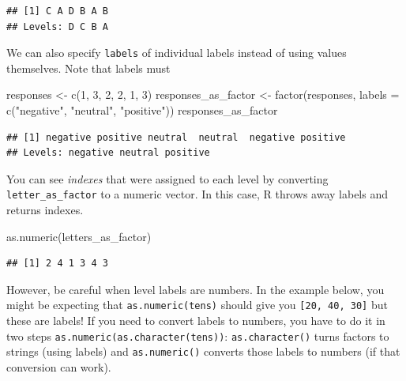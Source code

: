 \documentclass[
]{book}
\newenvironment{Shaded}{\begin{snugshade}}{\end{snugshade}}
\newcommand{\AttributeTok}[1]{\textcolor[rgb]{0.77,0.63,0.00}{#1}}
\newcommand{\DecValTok}[1]{\textcolor[rgb]{0.00,0.00,0.81}{#1}}
\newcommand{\FunctionTok}[1]{\textcolor[rgb]{0.00,0.00,0.00}{#1}}
\newcommand{\NormalTok}[1]{#1}
\newcommand{\OtherTok}[1]{\textcolor[rgb]{0.56,0.35,0.01}{#1}}
\newcommand{\StringTok}[1]{\textcolor[rgb]{0.31,0.60,0.02}{#1}}
\begin{document}
\begin{verbatim}
## [1] C A D B A B
## Levels: D C B A
\end{verbatim}

We can also specify \texttt{labels} of individual labels instead of using values themselves. Note that labels must

\begin{Shaded}
\begin{Highlighting}[]
\NormalTok{responses }\OtherTok{\textless{}{-}} \FunctionTok{c}\NormalTok{(}\DecValTok{1}\NormalTok{, }\DecValTok{3}\NormalTok{, }\DecValTok{2}\NormalTok{, }\DecValTok{2}\NormalTok{, }\DecValTok{1}\NormalTok{, }\DecValTok{3}\NormalTok{)}
\NormalTok{responses\_as\_factor }\OtherTok{\textless{}{-}} \FunctionTok{factor}\NormalTok{(responses, }\AttributeTok{labels =} \FunctionTok{c}\NormalTok{(}\StringTok{"negative"}\NormalTok{, }\StringTok{"neutral"}\NormalTok{, }\StringTok{"positive"}\NormalTok{))}
\NormalTok{responses\_as\_factor}
\end{Highlighting}
\end{Shaded}

\begin{verbatim}
## [1] negative positive neutral  neutral  negative positive
## Levels: negative neutral positive
\end{verbatim}

You can see \emph{indexes} that were assigned to each level by converting \texttt{letter\_as\_factor} to a numeric vector. In this case, R throws away labels and returns indexes.

\begin{Shaded}
\begin{Highlighting}[]
\FunctionTok{as.numeric}\NormalTok{(letters\_as\_factor)}
\end{Highlighting}
\end{Shaded}

\begin{verbatim}
## [1] 2 4 1 3 4 3
\end{verbatim}

However, be careful when level labels are numbers. In the example below, you might be expecting that \texttt{as.numeric(tens)} should give you \texttt{{[}20,\ 40,\ 30{]}} but these are labels! If you need to convert labels to numbers, you have to do it in two steps \texttt{as.numeric(as.character(tens))}: \texttt{as.character()} turns factors to strings (using labels) and \texttt{as.numeric()} converts those labels to numbers (if that conversion can work).
\end{document}
